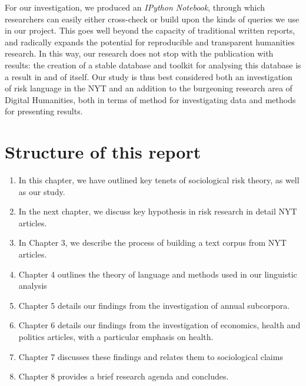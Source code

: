 For our investigation, we produced an \emph{IPython Notebook}, through which researchers can easily either cross-check or build upon the kinds of queries we use in our project. This goes well beyond the capacity of traditional written reports, and radically expands the potential for reproducible and transparent humanities research. In this way, our research does not stop with the publication with results: the creation of a stable database and toolkit for analysing this database is a result in and of itself. Our study is thus best considered both an investigation of risk language in the NYT and an addition to the burgeoning research area of Digital Humanities, both in terms of method for investigating data and methods for presenting results.

\section{Structure of this report}

\begin{enumerate}
\item In this chapter, we have outlined key tenets of sociological risk theory, as well as our study.
\item In the next chapter, we discuss key hypothesis in risk research in detail NYT articles.
\item In Chapter 3, we describe the process of building a text corpus from NYT articles.
\item Chapter 4 outlines the theory of language and methods used in our linguistic analysis
\item Chapter 5 details our findings from the investigation of annual subcorpora.
\item Chapter 6 details our findings from the investigation of economics, health and politics articles, with a particular emphasis on health.
\item Chapter 7 discusses these findings and relates them to sociological claims
\item Chapter 8 provides a brief research agenda and concludes.
\end{enumerate}



